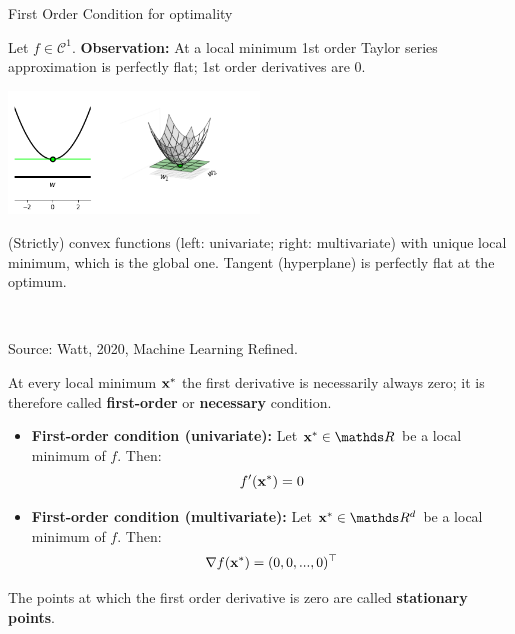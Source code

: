   \begin{vbframe}{First Order Condition for optimality}
  
  Let $f \in \mathcal{C}^1$. \textbf{Observation: } At a local minimum 1st order Taylor series approximation is perfectly flat; 1st order derivatives are $0$.

  \lz 
  
  \begin{center}
  \includegraphics[width = 0.5\textwidth]{figure_man/first_order.png} \\
  \begin{footnotesize}
  (Strictly) convex functions (left: univariate; right: multivariate) with unique local minimum, which is the global one. Tangent (hyperplane) is perfectly flat at the optimum. \end{footnotesize}\\
  \begin{tiny}
  Source: Watt, 2020, Machine Learning Refined. 
  \end{tiny}
  \end{center}
  
  \framebreak 
  
  At every local minimum $\mathbf{x}^\ast$ the first derivative is necessarily always zero; it is therefore called \textbf{first-order} or \textbf{necessary} condition. 
  
  \lz 

  \begin{itemize}
    \item \textbf{First-order condition (univariate): } Let $\xv^\ast \in \R$ be a local minimum of $f$. Then:
    $$
    f'(\mathbf{x}^\ast) = 0
    $$
    \item \textbf{First-order condition (multivariate): } Let $\xv^\ast \in \R^d$ be a local minimum of $f$. Then:
    $$
    \nabla f(\mathbf{x}^\ast) = (0, 0, ..., 0)^\top
    $$
  
  \end{itemize}
  
  The points at which the first order derivative is zero are called \textbf{stationary points}. 
  
  \framebreak 
  

\end{vbframe}

